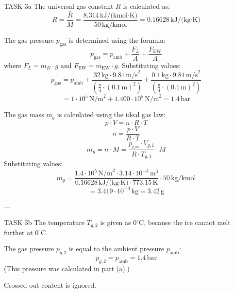 TASK 3a  
The universal gas constant \( R \) is calculated as:  
\[
R = \frac{\bar{R}}{M} = \frac{8.314 \, \text{kJ/(kmol·K)}}{50 \, \text{kg/kmol}} = 0.16628 \, \text{kJ/(kg·K)}
\]

The gas pressure \( p_{\text{gas}} \) is determined using the formula:  
\[
p_{\text{gas}} = p_{\text{amb}} + \frac{F_L}{A} + \frac{F_{\text{EW}}}{A}
\]
where \( F_L = m_K \cdot g \) and \( F_{\text{EW}} = m_{\text{EW}} \cdot g \). Substituting values:  
\[
p_{\text{gas}} = p_{\text{amb}} + \frac{32 \, \text{kg} \cdot 9.81 \, \text{m/s}^2}{\left(\frac{\pi}{4} \cdot (0.1 \, \text{m})^2\right)} + \frac{0.1 \, \text{kg} \cdot 9.81 \, \text{m/s}^2}{\left(\frac{\pi}{4} \cdot (0.1 \, \text{m})^2\right)}
\]
\[
= 1 \cdot 10^5 \, \text{N/m}^2 + 1.400 \cdot 10^5 \, \text{N/m}^2 = 1.4 \, \text{bar}
\]

The gas mass \( m_g \) is calculated using the ideal gas law:  
\[
p \cdot V = n \cdot R \cdot T
\]
\[
n = \frac{p \cdot V}{R \cdot T}
\]
\[
m_g = n \cdot M = \frac{p_{\text{gas}} \cdot V_{g,1}}{R \cdot T_{g,1}} \cdot M
\]
Substituting values:  
\[
m_g = \frac{1.4 \cdot 10^5 \, \text{N/m}^2 \cdot 3.14 \cdot 10^{-3} \, \text{m}^3}{0.16628 \, \text{kJ/(kg·K)} \cdot 773.15 \, \text{K}} \cdot 50 \, \text{kg/kmol}
\]
\[
= 3.419 \cdot 10^{-3} \, \text{kg} = 3.42 \, \text{g}
\]

---

TASK 3b  
The temperature \( T_{g,2} \) is given as \( 0^\circ\text{C} \), because the ice cannot melt further at \( 0^\circ\text{C} \).  

The gas pressure \( p_{g,2} \) is equal to the ambient pressure \( p_{\text{amb}} \):  
\[
p_{g,2} = p_{\text{amb}} = 1.4 \, \text{bar}
\]
(This pressure was calculated in part (a).)  

Crossed-out content is ignored.